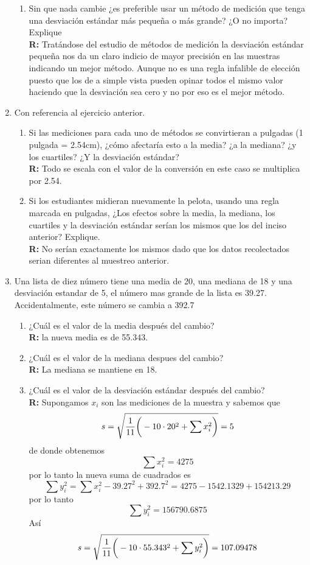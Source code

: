 \documentclass[10pt,a4paper]{book}
\begin{document}
\begin{enumerate}
\begin{enumerate}
		\item Sin que nada cambie ¿es preferible usar un método de medición que tenga una desviación estándar más pequeña o más grande? ¿O no importa? Explique\\
		\textbf{R:} Tratándose del estudio de métodos de medición la desviación estándar pequeña nos da un claro indicio de mayor precisión en las muestras indicando un mejor método. Aunque no es una regla infalible de elección  puesto que los de a simple vista pueden opinar todos el mismo valor haciendo que la desviación sea cero y no por eso es el mejor método.
		
		\end{enumerate}
	
	\item Con referencia al ejercicio anterior. 
	\begin{enumerate}
		\item Si las mediciones para cada uno de métodos se convirtieran a pulgadas (1 pulgada = 2.54cm), ¿cómo afectaría esto a la media? ¿a la mediana? ¿y los cuartiles? ¿Y la desviación estándar?\\
		\textbf{R:} Todo se escala con el valor de la conversión en este caso se multiplica por 2.54.
		
		\item Si los estudiantes midieran nuevamente la pelota, usando una regla marcada en pulgadas, ¿Los efectos sobre la media, la mediana, los cuartiles y la desviación estándar serían los mismos que los del inciso anterior? Explique.\\
		\textbf{R:} No serían exactamente los mismos dado que los datos recolectados serian diferentes al muestreo anterior.
	\end{enumerate}

	\item Una lista de diez número tiene una media de 20, una mediana de 18 y una desviación estandar de 5, el número mas grande de la lista es 39.27. Accidentalmente, este número se cambia a 392.7
	\begin{enumerate}
		\item ¿Cuál es el valor de la media después del cambio?\\
		\textbf{R:} la nueva media es de 55.343.
		\item ¿Cuál es el valor de la mediana despues del cambio?\\
		\textbf{R:} La mediana se mantiene en 18.
		\item ¿Cuál es el valor de la desviación estándar después del cambio?\\
		\textbf{R:} Supongamos $ x_i $ son las mediciones de la muestra y sabemos que  $$ s = \sqrt{\frac{1}{11}\bigg{(}-10\cdot20^2+ \sum x_i^2  \bigg{)}} = 5 $$ de donde obtenemos $$ \sum x_i^2 = 4275 $$ por lo tanto la nueva suma de cuadrados es $$ \sum y_i^2 = \sum x_i^2 - 39.27^2 + 392.7^2 = 4275 -1542.1329 + 154213.29 $$
		por lo tanto $$ \sum y_i^2 = 156790.6875 $$
		Así $$ s = \sqrt{\frac{1}{11}\bigg{(}-10\cdot55.343^2+ \sum y_i^2  \bigg{)}} = 107.09478 $$
	\end{enumerate}


\end{enumerate}
\end{document}
